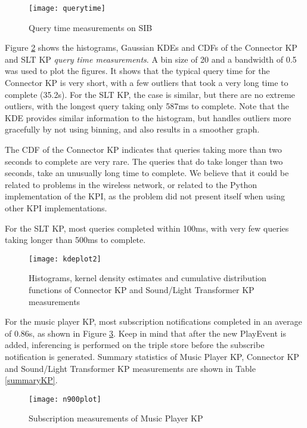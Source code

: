 \begin{figure}
\centerline{
\texttt{[image: querytime]}}
\caption{Query time measurements on SIB}
\label{querytime}
\end{figure}

Figure \ref{kdeplot} shows the histograms, Gaussian \acp{KDE} and \acp{CDF} of the Connector \ac{KP} and \ac{SLT} \ac{KP} \emph{query time measurements}. A bin size of 20 and a bandwidth of 0.5 was used to plot the figures. It shows that the typical query time for the Connector \ac{KP} is very short, with a few outliers that took a very long time to complete (35.2s). For the \ac{SLT} \ac{KP}, the case is similar, but there are no extreme outliers, with the longest query taking only 587ms to complete. Note that the \ac{KDE} provides similar information to the histogram, but handles outliers more gracefully by not using binning, and also results in a smoother graph.

The \ac{CDF} of the Connector \ac{KP} indicates that queries taking more than two seconds to complete are very rare. The queries that do take longer than two seconds, take an unusually long time to complete. We believe that it could be related to problems in the wireless network, or related to the Python implementation of the \ac{KPI}, as the problem did not present itself when using other \ac{KPI} implementations.

For the \ac{SLT} \ac{KP}, most queries completed within 100ms, with very few queries taking longer than 500ms to complete.

\begin{figure}
\centerline{
\texttt{[image: kdeplot2]}}
\caption{Histograms, kernel density estimates and cumulative distribution functions of Connector KP and Sound/Light Transformer KP measurements}
\label{kdeplot}
\end{figure}

For the music player \ac{KP}, most subscription notifications completed in an average of 0.86s, as shown in Figure \ref{n900plot}. Keep in mind that after the new PlayEvent is added, inferencing is performed on the triple store before the subscribe notification is generated. Summary statistics of Music Player \ac{KP}, Connector \ac{KP} and Sound/Light Transformer \ac{KP} measurements are shown in Table \ref{summaryKP}.

\begin{figure}
\centerline{
\texttt{[image: n900plot]}}
\caption{Subscription measurements of Music Player KP}
\label{n900plot}
\end{figure}


